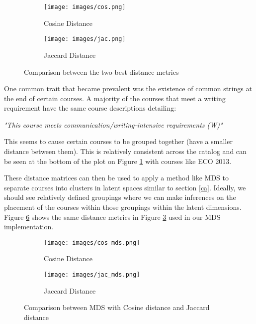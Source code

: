 \documentclass[11pt]{report}
\begin{document}
\begin{figure}[H]
\centering
\begin{subfigure}{.5\textwidth}
  \centering
  \texttt{[image: images/cos.png]}
  \caption{Cosine Distance}
  \label{fig:cos}
\end{subfigure}%
\begin{subfigure}{.5\textwidth}
  \centering
  \texttt{[image: images/jac.png]}
  \caption{Jaccard Distance}
  \label{fig:jac}
\end{subfigure}
\caption{Comparison between the two best distance metrics}
\label{fig:tile}
\end{figure}

One common trait that became prevalent was the existence of common strings at the end of certain courses.  A majority of the courses that meet a writing requirement have the same course descriptions detailing:

 \textit{"This course meets communication/writing-intensive requirements (W)"} 
 
This seems to cause certain courses to be grouped together (have a smaller distance between them).  This is relatively consistent across the catalog and can be seen at the bottom of the plot on Figure \ref{fig:cos} with courses like ECO 2013. 

These distance matrices can then be used to apply a method like MDS to separate courses into clusters in latent spaces similar to section \ref{ca}. Ideally, we should see relatively defined groupings where we can make inferences on the placement of the courses within those groupings within the latent dimensions.  Figure \ref{fig:tile2} shows the same distance metrics in Figure \ref{fig:tile} used in our MDS implementation.

\begin{figure}[H]
\centering
\begin{subfigure}{.5\textwidth}
  \centering
  \texttt{[image: images/cos\_mds.png]}
  \caption{Cosine Distance}
  \label{fig:cmds}
\end{subfigure}%
\begin{subfigure}{.5\textwidth}
  \centering
  \texttt{[image: images/jac\_mds.png]}
  \caption{Jaccard Distance}
  \label{fig:jmds}
\end{subfigure}
\caption{Comparison between MDS with Cosine distance and Jaccard distance}
\label{fig:tile2}
\end{figure}
\end{document}
